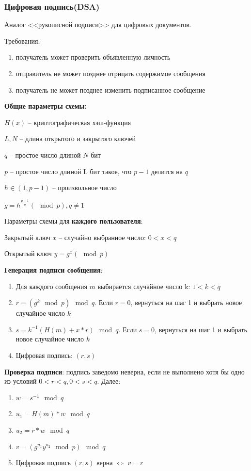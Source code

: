 \subsubsection{Цифровая подпись(DSA)}

Аналог <<рукописной подписи>> для цифровых документов.

Требования:
\begin{enumerate}
    \item получатель может проверить объявленную личность 
    \item отправитель не может позднее отрицать содержимое сообщения
    \item получатель не может позднее изменить подписанное сообщение
\end{enumerate}

\textbf{Общие параметры схемы:}

$H(x)$ -- криптографическая хэш-функция

$L, N$ -- длина открытого и закрытого ключей

$q$ -- простое число длиной $N$ бит

$p$ -- простое число длиной L бит такое, что $p - 1$ делится на $q$

$h \in (1, p - 1)$ -- произвольное число

$g = h^{\frac{p-1}{q}}(\mod p), q \neq 1$

Параметры схемы для \textbf{каждого пользователя}:

Закрытый ключ $x$ -- случайно выбранное число: $0 < x < q$

Открытый ключ $y = g^x(\mod p)$

\textbf{Генерация подписи сообщения}:

\begin{enumerate}
    \item Для каждого сообщения $m$ выбирается случайное число k: $1 < k < q$
    \item $r = (g^k \mod p) \mod q$. Если $r = 0$, вернуться на шаг 1 и выбрать новое случайное число $k$
    \item $s = k^{-1}(H(m) + x * r) \mod q$. Если $s = 0$, вернуться на шаг 1 и выбрать новое случайное число $k$
    \item Цифровая подпись: $(r, s)$
\end{enumerate}

\textbf{Проверка подписи}: подпись заведомо неверна, если не выполнено хотя бы одно из условий $0 < r < q, 0 < s < q$. Далее:

\begin{enumerate}
    \item $w = s^{-1} \mod q$
    \item $u_1 = H(m) * w \mod q$
    \item $u_2 = r * w \mod q$
    \item $v = (g^{u_1}y^{u_2} \mod p) \mod q$
    \item Цифровая подпись $(r, s)$ верна $\Leftrightarrow$ $v = r$
\end{enumerate}
